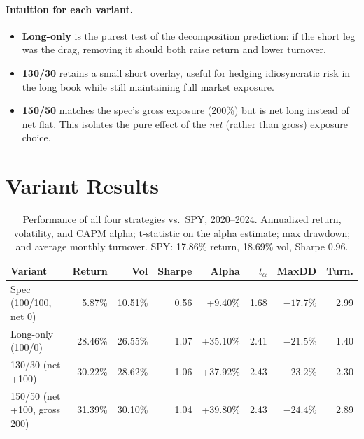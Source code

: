 \documentclass[11pt]{article}
\begin{document}
\paragraph{Intuition for each variant.}
\begin{itemize}[leftmargin=*, itemsep=2pt]
    \item \textbf{Long-only} is the purest test of the decomposition prediction: if the
    short leg was the drag, removing it should both raise return and lower turnover.
    \item \textbf{130/30} retains a small short overlay, useful for hedging idiosyncratic
    risk in the long book while still maintaining full market exposure.
    \item \textbf{150/50} matches the spec's gross exposure (200\%) but is net long
    instead of net flat. This isolates the pure effect of the \emph{net} (rather than
    gross) exposure choice.
\end{itemize}

\section{Variant Results}
\label{sec:variant_results}

\begin{table}[h]
\centering
\caption{Performance of all four strategies vs.\ SPY, 2020--2024. Annualized return,
volatility, and CAPM alpha; t-statistic on the alpha estimate; max drawdown; and
average monthly turnover. SPY: 17.86\% return, 18.69\% vol, Sharpe 0.96.}
\label{tab:variants}
\small
\begin{tabular}{lrrrrrrr}
\toprule
Variant & Return & Vol & Sharpe & Alpha & $t_\alpha$ & MaxDD & Turn. \\
\midrule
Spec (100/100, net 0)       &  5.87\% & 10.51\% & 0.56 &  +9.40\% & 1.68 & $-17.7\%$ & 2.99 \\
Long-only (100/0)           & 28.46\% & 26.55\% & 1.07 & +35.10\% & 2.41 & $-21.5\%$ & 1.40 \\
130/30 (net +100)           & 30.22\% & 28.62\% & 1.06 & +37.92\% & 2.43 & $-23.2\%$ & 2.30 \\
150/50 (net +100, gross 200) & 31.39\% & 30.10\% & 1.04 & +39.80\% & 2.43 & $-24.4\%$ & 2.89 \\
\bottomrule
\end{tabular}
\end{table}
\end{document}
